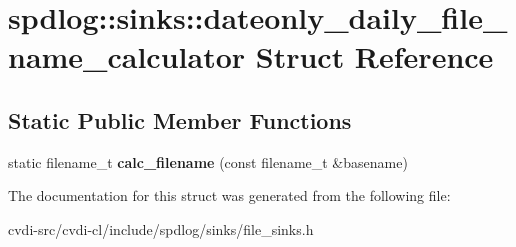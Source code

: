 \hypertarget{structspdlog_1_1sinks_1_1dateonly__daily__file__name__calculator}{}\section{spdlog\+:\+:sinks\+:\+:dateonly\+\_\+daily\+\_\+file\+\_\+name\+\_\+calculator Struct Reference}
\label{structspdlog_1_1sinks_1_1dateonly__daily__file__name__calculator}
\subsection*{Static Public Member Functions}
\begin{DoxyCompactItemize}
\item 
static filename\+\_\+t {\bfseries calc\+\_\+filename} (const filename\+\_\+t \&basename)\hypertarget{structspdlog_1_1sinks_1_1dateonly__daily__file__name__calculator_a2af5b2881a92a50c53dfccb2f180163d}{}\label{structspdlog_1_1sinks_1_1dateonly__daily__file__name__calculator_a2af5b2881a92a50c53dfccb2f180163d}

\end{DoxyCompactItemize}


The documentation for this struct was generated from the following file\+:\begin{DoxyCompactItemize}
\item 
cvdi-\/src/cvdi-\/cl/include/spdlog/sinks/file\+\_\+sinks.\+h\end{DoxyCompactItemize}
